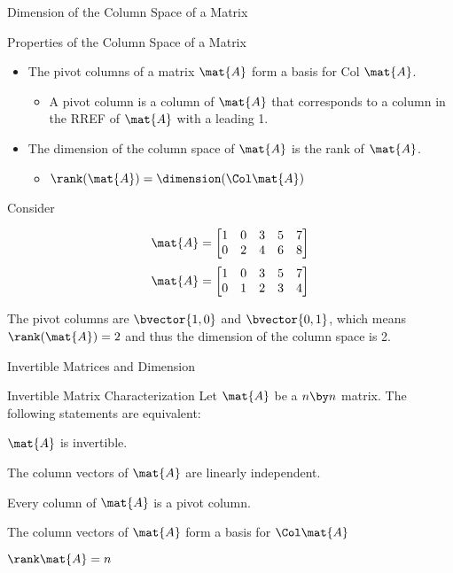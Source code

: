 \documentclass{beamer}
\begin{document}
\begin{frame}{Dimension of the Column Space of a Matrix}
\begin{block}{Properties of the Column Space of a Matrix}
\begin{itemize}
\item The pivot columns of a matrix $\mat{A}$ form a basis for Col $\mat{A}$.
\begin{itemize}
\item A pivot column is a column of $\mat{A}$ that corresponds to a column in the RREF of $\mat{A}$ with a leading 1.
\end{itemize}
\item The dimension of the column space of $\mat{A}$ is the rank of $\mat{A}$.
\begin{itemize}
\item $\rank(\mat{A})=\dimension(\Col\mat{A})$
\end{itemize}
\end{itemize}
\end{block}

\begin{example}
Consider
\begin{overprint}
\begin{equation*}
\mat{A}=
\begin{bmatrix}
1 & 0 & 3 & 5 & 7\\
0 & 2 & 4 & 6 & 8\\
\end{bmatrix}
\end{equation*}
\begin{equation*}
\mat{A}=
\begin{bmatrix}
1 & 0 & 3 & 5 & 7\\
0 & 1 & 2 & 3 & 4\\
\end{bmatrix}
\end{equation*}
\end{overprint}
The pivot columns are $\bvector{1,0}$ and $\bvector{0,1}$, which means $\rank(\mat{A})=2$ and thus the dimension of the column space is 2.
\end{example}
\end{frame}

\begin{frame}{Invertible Matrices and Dimension}
\begin{block}{Invertible Matrix Characterization}
Let $\mat{A}$ be a $n \by n$ matrix. The following statements are equivalent:
\begin{dynitemize}[<+- | alert@+>]
\item $\mat{A}$ is invertible.
\item The column vectors of $\mat{A}$ are linearly independent.
\item Every column of $\mat{A}$ is a pivot column.
\item The column vectors of $\mat{A}$ form a basis for $\Col\mat{A}$
\item $\rank\mat{A}=n$
\end{dynitemize}
\end{block}
\end{frame}
\end{document}
